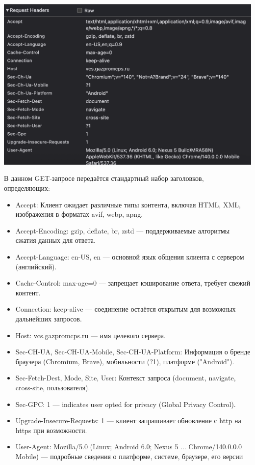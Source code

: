 \documentclass{article}
\begin{document}
\begin{center}
  \includegraphics[width=.9\textwidth]{9}
\end{center}
В данном GET-запросе передаётся стандартный набор заголовков, определяющих:
\begin{itemize}
  \item Accept: Клиент ожидает различные типы контента, включая HTML, XML, изображения в форматах avif, webp, apng.
  \item Accept-Encoding: gzip, deflate, br, zstd — поддерживаемые алгоритмы сжатия данных для ответа.
  \item Accept-Language: en-US, en — основной язык общения клиента с сервером (английский).
  \item Cache-Control: max-age=0 — запрещает кэширование ответа, требует свежий контент.
  \item Connection: keep-alive — соединение остаётся открытым для возможных дальнейших запросов.
  \item Host: vcs.gazpromcps.ru — имя целевого сервера.
  \item Sec-CH-UA, Sec-CH-UA-Mobile, Sec-CH-UA-Platform: Информация о бренде браузера (Chromium, Brave), мобильности (?1), платформе ("Android").
  \item Sec-Fetch-Dest, Mode, Site, User: Контекст запроса (document, navigate, cross-site, пользователя).
  \item Sec-GPC: 1 — indicates user opted for privacy (Global Privacy Control).
  \item Upgrade-Insecure-Requests: 1 — клиент запрашивает обновление с http на https при возможности.
  \item User-Agent: Mozilla/5.0 (Linux; Android 6.0; Nexus 5 ... Chrome/140.0.0.0 Mobile) — подробные сведения о платформе, системе, браузере, его версии
\end{itemize}
\end{document}
